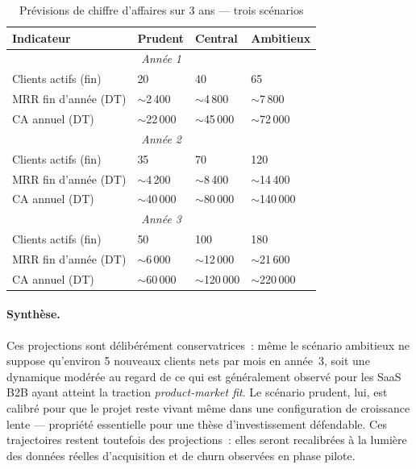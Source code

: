 \begin{table}[H]
\centering
\caption{Prévisions de chiffre d'affaires sur 3 ans — trois scénarios}
\label{tab:previsions_ca}
\begin{tabular}{|p{4cm}|p{3cm}|p{3cm}|p{3cm}|}
\hline
\textbf{Indicateur} & \textbf{Prudent} & \textbf{Central} & \textbf{Ambitieux} \\
\hline
\multicolumn{4}{|c|}{\textit{Année 1}} \\
\hline
Clients actifs (fin) & 20 & 40 & 65 \\
\hline
MRR fin d'année (DT) & $\sim$2\,400 & $\sim$4\,800 & $\sim$7\,800 \\
\hline
CA annuel (DT) & $\sim$22\,000 & $\sim$45\,000 & $\sim$72\,000 \\
\hline
\multicolumn{4}{|c|}{\textit{Année 2}} \\
\hline
Clients actifs (fin) & 35 & 70 & 120 \\
\hline
MRR fin d'année (DT) & $\sim$4\,200 & $\sim$8\,400 & $\sim$14\,400 \\
\hline
CA annuel (DT) & $\sim$40\,000 & $\sim$80\,000 & $\sim$140\,000 \\
\hline
\multicolumn{4}{|c|}{\textit{Année 3}} \\
\hline
Clients actifs (fin) & 50 & 100 & 180 \\
\hline
MRR fin d'année (DT) & $\sim$6\,000 & $\sim$12\,000 & $\sim$21\,600 \\
\hline
CA annuel (DT) & $\sim$60\,000 & $\sim$120\,000 & $\sim$220\,000 \\
\hline
\end{tabular}
\end{table}

\paragraph{Synthèse.} Ces projections sont délibérément conservatrices~: même le scénario ambitieux ne suppose qu'environ 5 nouveaux clients nets par mois en année~3, soit une dynamique modérée au regard de ce qui est généralement observé pour les SaaS B2B ayant atteint la traction \emph{product-market fit}. Le scénario prudent, lui, est calibré pour que le projet reste vivant même dans une configuration de croissance lente — propriété essentielle pour une thèse d'investissement défendable. Ces trajectoires restent toutefois des projections~: elles seront recalibrées à la lumière des données réelles d'acquisition et de churn observées en phase pilote.

